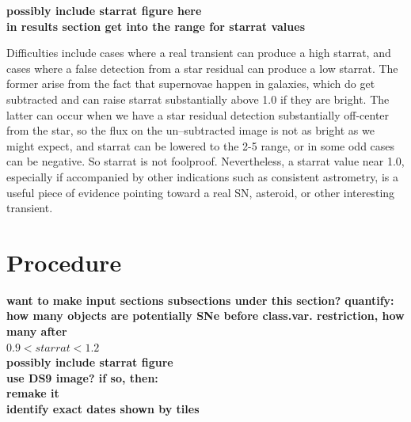 \documentclass[aps,prb,twocolumn,superscriptaddress]{revtex4-1}
\begin{document}
{\bf possibly include starrat figure here}\\
{\bf in results section get into the range for starrat values}

Difficulties include cases where a real transient can produce a high 
starrat, and cases where a false detection from a star residual can 
produce a low starrat. The former arise from the fact that supernovae 
happen in galaxies, which do get subtracted and can raise starrat 
substantially above 1.0 if they are bright. The latter can occur when 
we have a star residual detection substantially off-center from the 
star, so the flux on the un--subtracted image is not as bright as we might 
expect, and starrat can be lowered to the 2-5 range, or in some odd 
cases can be negative. So starrat is not foolproof. Nevertheless, a 
starrat value near 1.0, especially if accompanied by other indications 
such as consistent astrometry, is a useful piece of evidence pointing 
toward a real SN, asteroid, or other interesting transient.






\section{Procedure}
{\bf want to make input sections subsections under this section?}
{\bf quantify: how many objects are potentially SNe before class.var. restriction, how many after\\
$0.9 < starrat < 1.2$\\}
{\bf possibly include starrat figure\\
use DS9 image? if so, then:\\
\indent remake it\\
\indent identify exact dates shown by tiles}
\end{document}
